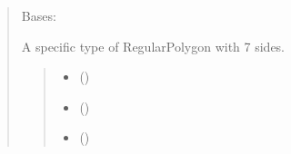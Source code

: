 \documentclass[letterpaper,10pt,english]{sphinxmanual}
\begin{document}
\begin{quote}
\begin{fulllineitems}
\begin{fulllineitems}
\begin{quote}
\begin{description}
\end{description}\end{quote}

\end{fulllineitems}


\end{fulllineitems}


\begin{fulllineitems}
\label{\detokenize{pygeox:pygeox.custom_objects.RegularHeptagon}}
\pysigstartsignatures
\pysiglinewithargsret
{}
{\sphinxparamcomma {}\sphinxparamcomma {}\sphinxparamcomma {}}
{}
\pysigstopsignatures
\sphinxAtStartPar
Bases: 

\sphinxAtStartPar
A specific type of RegularPolygon with 7 sides.
\begin{quote}\begin{description}
\begin{itemize}
\item {} 
\sphinxAtStartPar
{} ()

\item {} 
\sphinxAtStartPar
{} (\sphinxstyleliteralemphasis{\sphinxupquote{ | }})

\item {} 
\sphinxAtStartPar
{} (\sphinxstyleliteralemphasis{\sphinxupquote{ | }})

\end{itemize}

\end{description}\end{quote}


\end{fulllineitems}
\end{quote}
\end{document}
